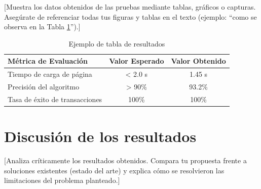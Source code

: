 [Muestra los datos obtenidos de las pruebas mediante tablas, gráficos o capturas. Asegúrate de referenciar todas tus figuras y tablas en el texto (ejemplo: ``como se observa en la Tabla \ref{tab:ejemplo}'').]

\begin{table}[H]
    \centering
    \caption{Ejemplo de tabla de resultados}
    \begin{tabular}{|l|c|c|}
        \hline
        \textbf{Métrica de Evaluación} & \textbf{Valor Esperado} & \textbf{Valor Obtenido} \\ \hline
        Tiempo de carga de página & < 2.0 s & 1.45 s \\ \hline
        Precisión del algoritmo   & > 90\%  & 93.2\% \\ \hline
        Tasa de éxito de transacciones & 100\% & 100\% \\ \hline
    \end{tabular}
    \label{tab:ejemplo}
\end{table}

\section{Discusión de los resultados}

[Analiza críticamente los resultados obtenidos. Compara tu propuesta frente a soluciones existentes (estado del arte) y explica cómo se resolvieron las limitaciones del problema planteado.]
